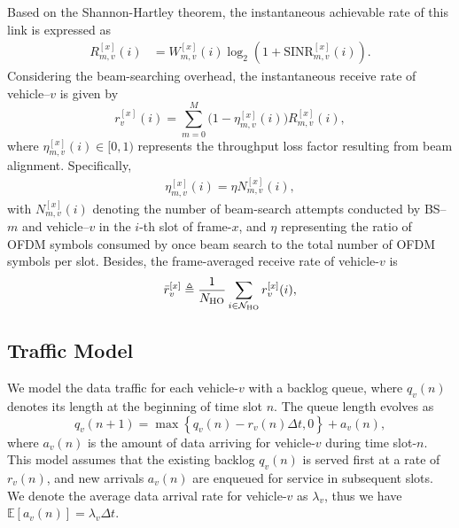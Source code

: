\documentclass[conference, a4paper]{IEEEtran}
\theoremstyle{remark}
\begin{document}
Based on the Shannon-Hartley theorem, the instantaneous achievable rate of this link is expressed as
\begin{align}
    R_{m,v}^{[x]}(i) & = W_{m,v}^{[x]}(i) \log_2 \left( 1 + \mathrm{SINR}_{m,v}^{[x]}(i) \right).
    \label{eq:instantaneous link achievable rate}
\end{align}
Considering the beam-searching overhead, the instantaneous receive rate of vehicle–$v$ is given by
\begin{equation}
    r_{v}^{[x]}(i) = \sum_{m=0}^M \bigl(1-\eta_{m,v}^{[x]}(i) \bigl)R_{m,v}^{[x]}(i),
    \label{eq:instantaneous veh receive rate}
\end{equation}
where $\eta_{m,v}^{[x]}(i) \in [0,1)$ represents the throughput loss factor resulting from beam alignment. Specifically,
\begin{align}
\eta_{m,v}^{[x]}(i) = \eta N_{m,v}^{[x]}(i),
\end{align}
with $N_{m,v}^{[x]}(i)$ denoting the number of beam-search attempts conducted by BS–$m$ and vehicle–$v$ in the $i$-th slot of frame-$x$, and $\eta$ representing the ratio of OFDM symbols consumed by once beam search to the total number of OFDM symbols per slot.
Besides, the frame-averaged receive rate of vehicle-$v$ is 
\begin{equation}
    \bar{r}_v^{[x]} \triangleq  \frac{1}{N_{\rm HO}}\sum_{ i \in \mathcal{N}_{\rm HO}}r_{v}^{[x]}(i),
    \label{eq:frame-averaged veh receive rate}
\end{equation}


\subsection{Traffic Model}
We model the data traffic for each vehicle-$v$ with a backlog queue, where $q_v(n)$ denotes its length at the beginning of time slot $n$. The queue length evolves as
\begin{equation}
    q_v(n+1) = \max \left\{ q_v(n) - r_v(n) \Delta t, 0 \right\} + a_v(n),
    \label{eq: queue update}
\end{equation}
where $a_v(n)$ is the amount of data arriving for vehicle-$v$ during time slot-$n$.
This model assumes that the existing backlog $q_v(n)$ is served first at a rate of $r_v(n)$, and new arrivals $a_v(n)$ are enqueued for service in subsequent slots. 
We denote the average data arrival rate for vehicle-$v$ as $\lambda_v$, thus we have $\mathbb{E}\left[ a_v(n) \right] = \lambda_v \Delta t$.
\end{document}
